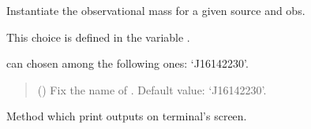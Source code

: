 \documentclass[letterpaper,10pt,english]{sphinxmanual}
\begin{document}
\begin{fulllineitems}
\label{\detokenize{source/api/setup_astro_mtov:nucleardatapy.setup_astro_mtov.SetupAstroMtov}}
\pysigstartsignatures
\pysiglinewithargsret
{}
{\sphinxparamcomma {}}
{}
\pysigstopsignatures
\sphinxAtStartPar
Instantiate the observational mass for a given source and obs.

\sphinxAtStartPar
This choice is defined in the variable .

\sphinxAtStartPar
{} can chosen among the following ones: ‘J1614\textendash{}2230’.
\begin{quote}\begin{description}
\sphinxAtStartPar
{} (\sphinxstyleliteralemphasis{\sphinxupquote{, }}) \textendash{} Fix the name of . Default value: ‘J1614\textendash{}2230’.

\end{description}\end{quote}

\sphinxAtStartPar
{}

\begin{fulllineitems}
\label{\detokenize{source/api/setup_astro_mtov:nucleardatapy.setup_astro_mtov.SetupAstroMtov.print_outputs}}
\pysigstartsignatures
\pysiglinewithargsret
{}
{}
{}
\pysigstopsignatures
\sphinxAtStartPar
Method which print outputs on terminal’s screen.

\end{fulllineitems}


\end{fulllineitems}
\end{document}
